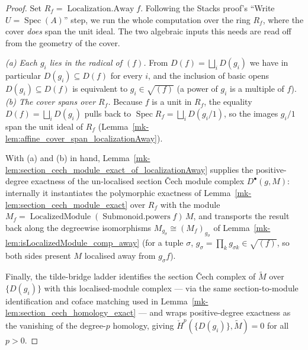 \begin{proof}
  Set \(R_f = \operatorname{Localization.Away} f\). Following the Stacks proof's ``Write
  \(U = \operatorname{Spec}(A)\)'' step, we run the whole computation over the ring \(R_f\), where the
  cover \emph{does} span the unit ideal. The two algebraic inputs this needs are read off from the
  geometry of the cover.

  \emph{(a) Each \(g_i\) lies in the radical of \((f)\).} From \(D(f) = \bigsqcup_i D(g_i)\) we have in
  particular \(D(g_i) \subseteq D(f)\) for every \(i\), and the inclusion of basic opens
  \(D(g_i) \subseteq D(f)\) is equivalent to \(g_i \in \sqrt{(f)}\) (a power of \(g_i\) is a multiple of
  \(f\)). \emph{(b) The cover spans over \(R_f\).} Because \(f\) is a unit in \(R_f\), the equality
  \(D(f) = \bigsqcup_i D(g_i)\) pulls back to \(\operatorname{Spec} R_f = \bigsqcup_i D(g_i/1)\), so the
  images \(g_i/1\) span the unit ideal of \(R_f\) (Lemma~\ref{mk-lem:affine_cover_span_localizationAway}).

  With (a) and (b) in hand, Lemma~\ref{mk-lem:section_cech_module_exact_of_localizationAway} supplies the
  positive-degree exactness of the un-localised section {\v C}ech module complex \(D^\bullet(g, M)\):
  internally it instantiates the polymorphic exactness of
  Lemma~\ref{mk-lem:section_cech_module_exact} over \(R_f\) with the module
  \(M_f = \operatorname{LocalizedModule}(\operatorname{Submonoid.powers} f)\, M\), and transports the
  result back along the degreewise isomorphisms \(M_{g_\sigma} \cong (M_f)_{g_\sigma}\) of
  Lemma~\ref{mk-lem:isLocalizedModule_comp_away} (for a tuple \(\sigma\), \(g_\sigma = \prod_k g_{\sigma k}
  \in \sqrt{(f)}\), so both sides present \(M\) localised away from \(g_\sigma f\)).

  Finally, the tilde-bridge ladder identifies the section {\v C}ech complex of \(\widetilde{M}\) over
  \(\{D(g_i)\}\) with this localised-module complex --- via the same section-to-module identification
  and coface matching used in Lemma~\ref{mk-lem:section_cech_homology_exact} --- and wraps positive-degree
  exactness as the vanishing of the degree-\(p\) homology, giving
  \(\check{H}^p(\{D(g_i)\}, \widetilde{M}) = 0\) for all \(p > 0\).
\end{proof}

